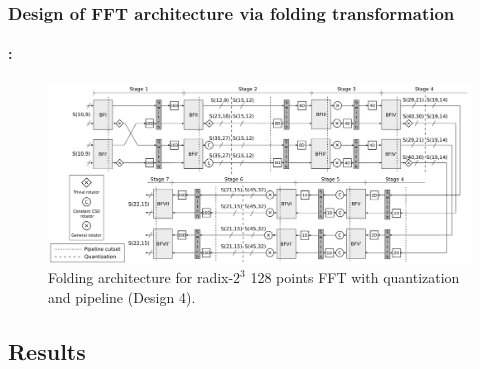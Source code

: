 \begin{frame}
	\frametitle{\textbf{Design of FFT architecture via folding transformation}}
	\framesubtitle{\secname : \subsecname}
	\vspace{-0.5cm}	
		\begin{figure}[h!] \centering
		   	\includegraphics[width=0.95\paperwidth]{./image/folding-128-quant-pipe.png}
		   	\caption{ \tiny Folding architecture for radix-$2^3$ 128 points FFT with quantization and pipeline (Design 4).}
		\end{figure}  	
\end{frame}



\subsection{Results}

